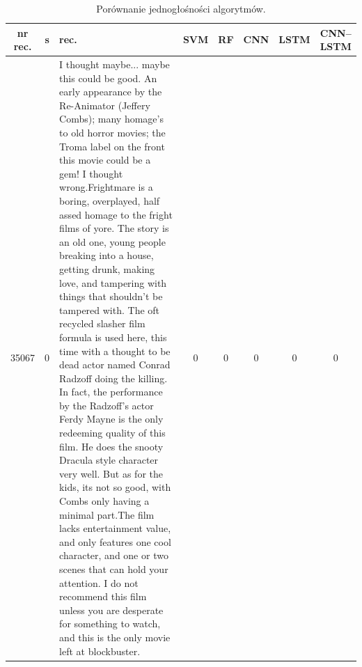 \begin{table}
	\caption{Porównanie jednogłośności algorytmów.}
	\label{tab:porownanie-przyklady}
	\begin{tabular}{ |c|c|p{15cm}| c c c c c |}
		\hline
		nr rec.&	s &	rec.	&  	SVM &	RF &	CNN & LSTM & 	CNN--LSTM \\
		\hline
		35067& 0 & {\scriptsize I thought maybe... maybe this could be good. An early appearance by the Re-Animator (Jeffery Combs); many homage's to old horror movies; the Troma label on the front this movie could be a gem! I thought wrong.Frightmare is a boring, overplayed, half assed homage to the fright films of yore. The story is an old one, young people breaking into a house, getting drunk, making love, and tampering with things that shouldn't be tampered with. The oft recycled slasher film formula is used here, this time with a thought to be dead actor named Conrad Radzoff doing the killing. In fact, the performance by the Radzoff's actor Ferdy Mayne is the only redeeming quality of this film. He does the snooty Dracula style character very well. But as for the kids, its not so good, with Combs only having a minimal part.The film lacks entertainment value, and only features one cool character, and one or two scenes that can hold your attention. I do not recommend this film unless you are desperate for something to watch, and this is the only movie left at blockbuster.} &  0 & 0 & 0 &0 & 0 \\
		\hline
		

\end{tabular}
\end{table}
